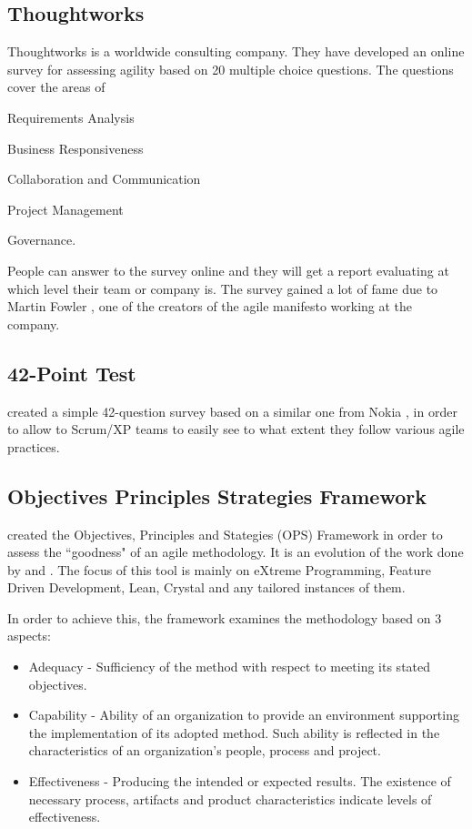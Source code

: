 \subsection{Thoughtworks} %
Thoughtworks \cite{thoughtworks} is a worldwide consulting company. They have developed an online survey for assessing agility based on 20 multiple choice questions. The questions cover the areas of 
\begin{inparaenum} [a\upshape)]
	\item Requirements Analysis
	\item Business Responsiveness
	\item Collaboration and Communication
	\item Project Management
	\item Governance.
\end{inparaenum}
People can answer to the survey online and they will get a report evaluating at which level their team or company is. The survey gained a lot of fame due to Martin Fowler \cite{martin_fowler}, one of the creators of the agile manifesto working at the company.

\subsection{42-Point Test}
\citet{42points} created a simple 42-question survey based on a similar one from Nokia \cite{nokia}, in order to allow to Scrum/XP teams to easily see to what extent they follow various agile practices.

\subsection{Objectives Principles Strategies Framework}
\label{subsec:ops}
\citet{sventha_dissertation} created the Objectives, Principles and Stategies (\ac{OPS}) Framework in order to assess the ``goodness" of an agile methodology. It is an evolution of the work done by \citet{2604} and \citet{sidky_dissertation}. The focus of this tool is mainly on eXtreme Programming, Feature Driven Development, Lean, Crystal and any tailored instances of them.

In order to achieve this, the framework examines the methodology based on 3 aspects:
\begin{itemize}
\item Adequacy - Sufficiency of the method with respect to meeting its stated objectives.
\item Capability - Ability of an organization to provide an environment supporting the implementation of its adopted method. Such ability is reflected in the characteristics of an organization's people, process
and project.
\item Effectiveness - Producing the intended or expected results. The existence of necessary process, artifacts and product characteristics indicate levels of effectiveness.
\end{itemize}

